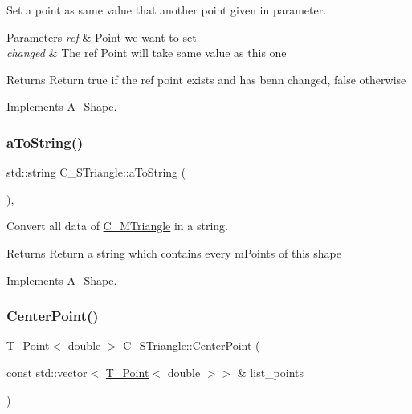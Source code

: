 Set a point as same value that another point given in parameter. 


\begin{DoxyParams}{Parameters}
{\em ref} & Point we want to set \\
\hline
{\em changed} & The ref Point will take same value as this one \\
\hline
\end{DoxyParams}
\begin{DoxyReturn}{Returns}
Return true if the ref point exists and has benn changed, false otherwise 
\end{DoxyReturn}


Implements \hyperlink{classA__Shape_a6996f454b337f8425ad13cba3f7a7c35}{A\+\_\+\+Shape}.

\mbox{\label{classC__STriangle_a1ea089f6a82c2770e0529c4a9fc07d90}} 
\subsubsection{\texorpdfstring{a\+To\+String()}{aToString()}}
{\footnotesize\ttfamily std\+::string C\+\_\+\+S\+Triangle\+::a\+To\+String (\begin{DoxyParamCaption}{ }\end{DoxyParamCaption})\hspace{0.3cm}{\ttfamily [override]}, {\ttfamily [virtual]}}



Convert all data of \hyperlink{classC__MTriangle}{C\+\_\+\+M\+Triangle} in a string. 

\begin{DoxyReturn}{Returns}
Return a string which contains every m\+Points of this shape 
\end{DoxyReturn}


Implements \hyperlink{classA__Shape_ad8804b4e74543db374af6892367b7c2e}{A\+\_\+\+Shape}.

\mbox{\label{classC__STriangle_a98c01a7d57aeee85ee4e2df88a786b7f}} 
\subsubsection{\texorpdfstring{Center\+Point()}{CenterPoint()}}
{\footnotesize\ttfamily \hyperlink{classT__Point}{T\+\_\+\+Point}$<$ double $>$ C\+\_\+\+S\+Triangle\+::\+Center\+Point (\begin{DoxyParamCaption}\item[{const std\+::vector$<$ \hyperlink{classT__Point}{T\+\_\+\+Point}$<$ double $>$$>$ \&}]{list\+\_\+points }\end{DoxyParamCaption})\hspace{0.3cm}{\ttfamily [static]}}



